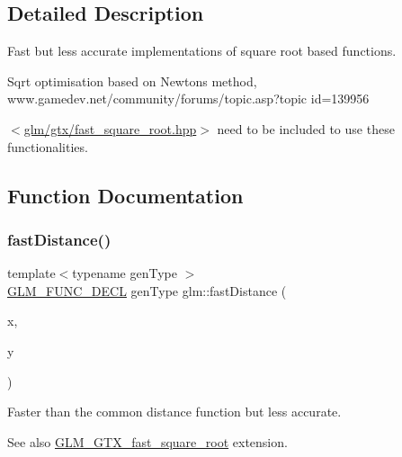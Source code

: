 \subsection{Detailed Description}
Fast but less accurate implementations of square root based functions. 


\begin{DoxyItemize}
\item Sqrt optimisation based on Newton\textquotesingle{}s method, www.\+gamedev.\+net/community/forums/topic.asp?topic id=139956
\end{DoxyItemize}

$<$\mbox{\hyperlink{fast__square__root_8hpp}{glm/gtx/fast\+\_\+square\+\_\+root.\+hpp}}$>$ need to be included to use these functionalities. 

\subsection{Function Documentation}
\mbox{\label{group__gtx__fast__square__root_gaac333418d0c4e0cc6d3d219ed606c238}} 
\subsubsection{\texorpdfstring{fastDistance()}{fastDistance()}\hspace{0.1cm}{\footnotesize\ttfamily [1/2]}}
{\footnotesize\ttfamily template$<$typename gen\+Type $>$ \\
\mbox{\hyperlink{setup_8hpp_ab2d052de21a70539923e9bcbf6e83a51}{G\+L\+M\+\_\+\+F\+U\+N\+C\+\_\+\+D\+E\+CL}} gen\+Type glm\+::fast\+Distance (\begin{DoxyParamCaption}\item[{gen\+Type}]{x,  }\item[{gen\+Type}]{y }\end{DoxyParamCaption})}

Faster than the common distance function but less accurate.

\begin{DoxySeeAlso}{See also}
\mbox{\hyperlink{group__gtx__fast__square__root}{G\+L\+M\+\_\+\+G\+T\+X\+\_\+fast\+\_\+square\+\_\+root}} extension. 
\end{DoxySeeAlso}


